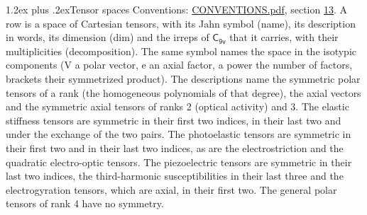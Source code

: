 \documentclass[10pt,a4paper]{article}
\makeatletter
\renewcommand\section{\@startsection{section}{1}{\z@}{-3ex plus -1ex minus -.2ex}%
  {1.2ex plus .2ex}{\normalfont\large\sffamily\bfseries\color{parttitle}}}
\numberwithin{equation}{section}
\newcommand{\grp}[1]{\mathsf{#1}}
\makeatother
\begin{document}
\section{Tensor spaces}\label{s:tensor_spaces}
Conventions: \href{../../CONVENTIONS.pdf}{CONVENTIONS.pdf}, section \href{../../CONVENTIONS.pdf\#conv.13}{13}.
\leavevmode\label{n:head.name}\label{n:head.description}\label{n:head.dim}\label{n:head.decomposition}A row is a space of Cartesian tensors, with its Jahn symbol (name), its description in words, its dimension (dim) and the irreps of $\grp{C_{9v}}$ that it carries, with their multiplicities (decomposition). \label{n:label.jahn}The same symbol names the space in the isotypic components (V a polar vector, e an axial factor, a power the number of factors, brackets their symmetrized product). The descriptions name the symmetric polar tensors of a rank (the homogeneous polynomials of that degree), the axial vectors and the symmetric axial tensors of ranks 2 (optical activity) and 3. The elastic stiffness tensors are symmetric in their first two indices, in their last two and under the exchange of the two pairs. The photoelastic tensors are symmetric in their first two and in their last two indices, as are the electrostriction and the quadratic electro-optic tensors. The piezoelectric tensors are symmetric in their last two indices, the third-harmonic susceptibilities in their last three and the electrogyration tensors, which are axial, in their first two. The general polar tensors of rank 4 have no symmetry.
\end{document}
